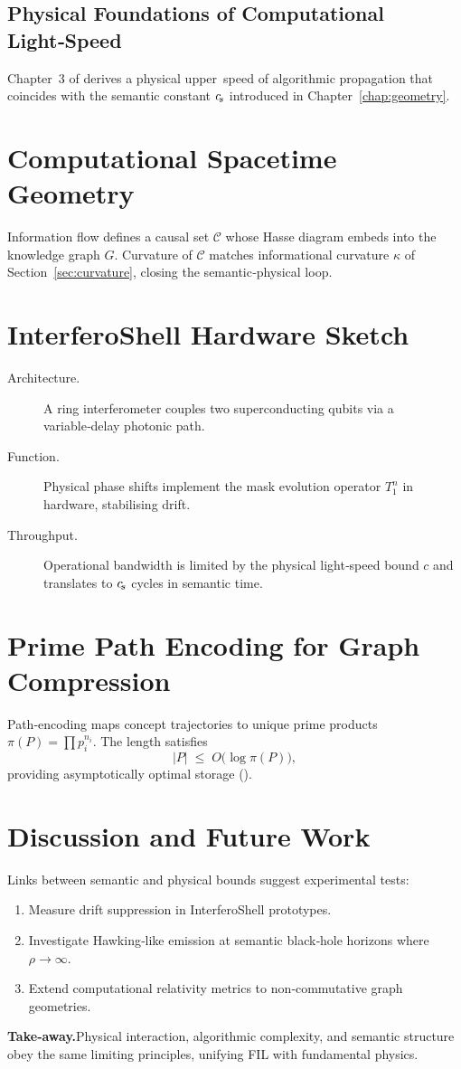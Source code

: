 \subsection{Physical Foundations of Computational Light‑Speed}
Chapter~3 of \cite{PhysLightSpeed} derives a physical upper speed of algorithmic propagation that coincides with the semantic constant $c_{\!s}$ introduced in Chapter~\ref{chap:geometry}.

\section{Computational Spacetime Geometry}\label{sec:csg}
Information flow defines a causal set $\mathcal C$ whose Hasse diagram embeds into the knowledge graph $G$.  Curvature of $\mathcal C$ matches informational curvature $\kappa$ of Section~\ref{sec:curvature}, closing the semantic‑physical loop.

\section{InterferoShell Hardware Sketch}\label{sec:ishell}

\begin{description}
  \item[Architecture.]  A ring interferometer couples two superconducting qubits via a variable‑delay photonic path.
  \item[Function.]     Physical phase shifts implement the mask evolution operator $T^n_1$ in hardware, stabilising drift.
  \item[Throughput.]   Operational bandwidth is limited by the physical light‑speed bound $c$ and translates to $c_{\!s}$ cycles in semantic time.
\end{description}

\section{Prime Path Encoding for Graph Compression}\label{sec:path-encoding}

Path‑encoding maps concept trajectories to unique prime products $\pi(P)=\prod p_i^{n_i}$.  The length satisfies
\begin{equation}
  |P|\;\le\;O\bigl(\log \pi(P)\bigr),
\end{equation}
providing asymptotically optimal storage (\cite{PathEncoding}).

\section{Discussion and Future Work}\label{sec:future}
Links between semantic and physical bounds suggest experimental tests:
\begin{enumerate}
  \item Measure drift suppression in InterferoShell prototypes.
  \item Investigate Hawking‑like emission at semantic black‑hole horizons where $\rho\to\infty$.
  \item Extend computational relativity metrics to non‑commutative graph geometries.
\end{enumerate}

\bigskip\noindent\textbf{Take‑away.}\;Physical interaction, algorithmic complexity, and semantic structure obey the same limiting principles, unifying FIL with fundamental physics.

\clearpage
